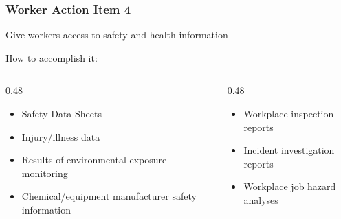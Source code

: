 \begin{frame}
    \frametitle{Worker Action Item 4}

    Give workers access to safety and health information

    \begin{block}{How to accomplish it:}
        \vspace{-1.5em}
        \begin{columns}[t]
            \begin{column}{0.48\linewidth}
                \begin{itemize}
                    \item Safety Data Sheets
                    \item Injury/illness data
                    \item Results of environmental exposure monitoring
                    \item Chemical/equipment manufacturer safety information
                \end{itemize}
            \end{column}
            \begin{column}{0.48\linewidth}
                \begin{itemize}
                    \item Workplace inspection reports
                    \item Incident investigation reports
                    \item Workplace job hazard analyses
                \end{itemize}
            \end{column}
        \end{columns}    
    \end{block}
\end{frame}


